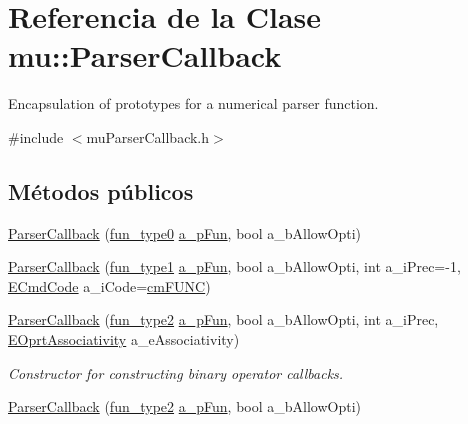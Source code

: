 \hypertarget{classmu_1_1_parser_callback}{}\section{Referencia de la Clase mu\+:\+:Parser\+Callback}
\label{classmu_1_1_parser_callback}


Encapsulation of prototypes for a numerical parser function.  




{\ttfamily \#include $<$mu\+Parser\+Callback.\+h$>$}

\subsection*{Métodos públicos}
\begin{DoxyCompactItemize}
\item 
\hyperlink{classmu_1_1_parser_callback_a3f203039da4fe6deaabd7ea289a82386}{Parser\+Callback} (\hyperlink{namespacemu_af74b1b05cca11b94eb7a478c6c1f8200}{fun\+\_\+type0} \hyperlink{mu_parser_d_l_l_8h_ab3a3ed85edf393f2b8ad69081fe538e8}{a\+\_\+p\+Fun}, bool a\+\_\+b\+Allow\+Opti)
\item 
\hyperlink{classmu_1_1_parser_callback_a4efbbc71ad2b29987e569afa1451bbd1}{Parser\+Callback} (\hyperlink{namespacemu_affeaec09801b502b9955d7248b7e2706}{fun\+\_\+type1} \hyperlink{mu_parser_d_l_l_8h_ab3a3ed85edf393f2b8ad69081fe538e8}{a\+\_\+p\+Fun}, bool a\+\_\+b\+Allow\+Opti, int a\+\_\+i\+Prec=-\/1, \hyperlink{namespacemu_ab77181e591bebd278bf9c7a2e30ad40e}{E\+Cmd\+Code} a\+\_\+i\+Code=\hyperlink{namespacemu_ab77181e591bebd278bf9c7a2e30ad40eaeacb1b1bb9859e8bc6147887a787feca}{cm\+F\+U\+NC})
\item 
\hyperlink{classmu_1_1_parser_callback_a22e961968ba20b101d85cb923e77dd3a}{Parser\+Callback} (\hyperlink{namespacemu_abd9aed5816d33116d687f5becd85b38f}{fun\+\_\+type2} \hyperlink{mu_parser_d_l_l_8h_ab3a3ed85edf393f2b8ad69081fe538e8}{a\+\_\+p\+Fun}, bool a\+\_\+b\+Allow\+Opti, int a\+\_\+i\+Prec, \hyperlink{namespacemu_aff435b0c277f66041374f93a3803e1f1}{E\+Oprt\+Associativity} a\+\_\+e\+Associativity)
\begin{DoxyCompactList}\small\item\em Constructor for constructing binary operator callbacks. \end{DoxyCompactList}\item 
\hyperlink{classmu_1_1_parser_callback_ab82fdaefcaa0bda28122768fa1eae317}{Parser\+Callback} (\hyperlink{namespacemu_abd9aed5816d33116d687f5becd85b38f}{fun\+\_\+type2} \hyperlink{mu_parser_d_l_l_8h_ab3a3ed85edf393f2b8ad69081fe538e8}{a\+\_\+p\+Fun}, bool a\+\_\+b\+Allow\+Opti)

\end{DoxyCompactItemize}
